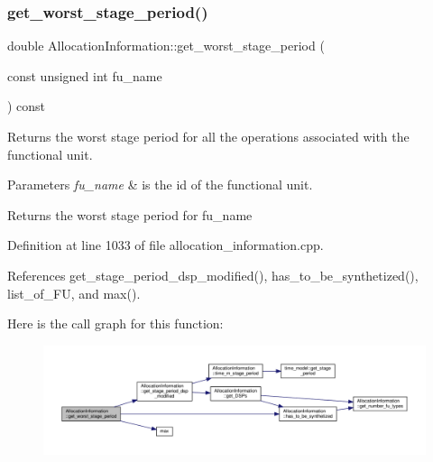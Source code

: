 \subsubsection{\texorpdfstring{get\+\_\+worst\+\_\+stage\+\_\+period()}{get\_worst\_stage\_period()}}
{\footnotesize\ttfamily double Allocation\+Information\+::get\+\_\+worst\+\_\+stage\+\_\+period (\begin{DoxyParamCaption}\item[{const unsigned int}]{fu\+\_\+name }\end{DoxyParamCaption}) const\hspace{0.3cm}{\ttfamily [private]}}



Returns the worst stage period for all the operations associated with the functional unit. 


\begin{DoxyParams}{Parameters}
{\em fu\+\_\+name} & is the id of the functional unit. \\
\hline
\end{DoxyParams}
\begin{DoxyReturn}{Returns}
the worst stage period for fu\+\_\+name 
\end{DoxyReturn}


Definition at line 1033 of file allocation\+\_\+information.\+cpp.



References get\+\_\+stage\+\_\+period\+\_\+dsp\+\_\+modified(), has\+\_\+to\+\_\+be\+\_\+synthetized(), list\+\_\+of\+\_\+\+FU, and max().

Here is the call graph for this function\+:
\nopagebreak
\begin{figure}[H]
\begin{center}
\leavevmode
\includegraphics[width=350pt]{d7/d79/classAllocationInformation_a86d1df5f0669734901d715e740200c1c_cgraph}
\end{center}
\end{figure}
\mbox{\label{classAllocationInformation_af577557336def6acf7f839f803c4ecc7}} 

